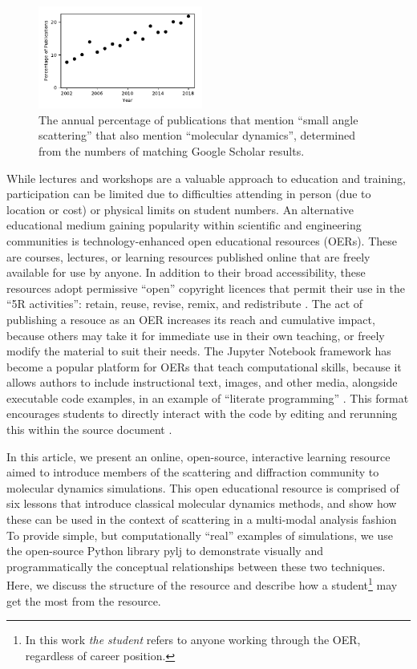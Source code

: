 \documentclass[amsmath,amssymb,twocolumn,superscriptaddress]{revtex4-1}
\begin{document}
%
\begin{figure}
\label{fig:growth}
\includegraphics[width=0.48\textwidth]{figures/chem_data_py.pdf}
\caption{The annual percentage of publications that mention ``small angle scattering'' that also mention ``molecular dynamics'', determined from the numbers of matching Google Scholar results.}
\end{figure}
%

While lectures and workshops are a valuable approach to education and training, participation can be limited due to difficulties attending in person (due to location or cost) or physical limits on student numbers.
An alternative educational medium gaining popularity within scientific and engineering communities is technology-enhanced open educational resources (OERs).
These are courses, lectures, or learning resources published online that are freely available for use by anyone. In addition to their broad accessibility, these resources adopt permissive ``open'' copyright licences that permit their use in the ``5R activities'': retain, reuse, revise, remix, and redistribute \cite{wiley_open_2018}.
The act of publishing a resouce as an OER increases its reach and cumulative impact, because others may take it for immediate use in their own teaching, or freely modify the material to suit their needs.
The Jupyter Notebook framework \cite{kluyver_jupyter_2016} has become a popular platform for OERs that teach computational skills, because it allows authors to include instructional text, images, and other media, alongside executable code examples, in an example of ``literate programming'' \cite{knuth_literate_1984}.
This format encourages students to directly interact with the code by editing and rerunning this within the source document \cite{barba_cybertraining_2017}.

In this article, we present an online, open-source, interactive learning resource aimed to introduce members of the scattering and diffraction community to molecular dynamics simulations.
This open educational resource is comprised of six lessons that introduce classical molecular dynamics methods, and show how these can be used in the context of scattering in a multi-modal analysis fashion
To provide simple, but computationally ``real'' examples of simulations, we use the open-source Python library pylj \cite{mccluskey_pylj_2018} to demonstrate visually and programmatically the conceptual relationships between these two techniques.
Here, we discuss the structure of the resource and describe how a student\footnote{In this work \emph{the student} refers to anyone working through the OER, regardless of career position.} may get the most from the resource.
\end{document}
